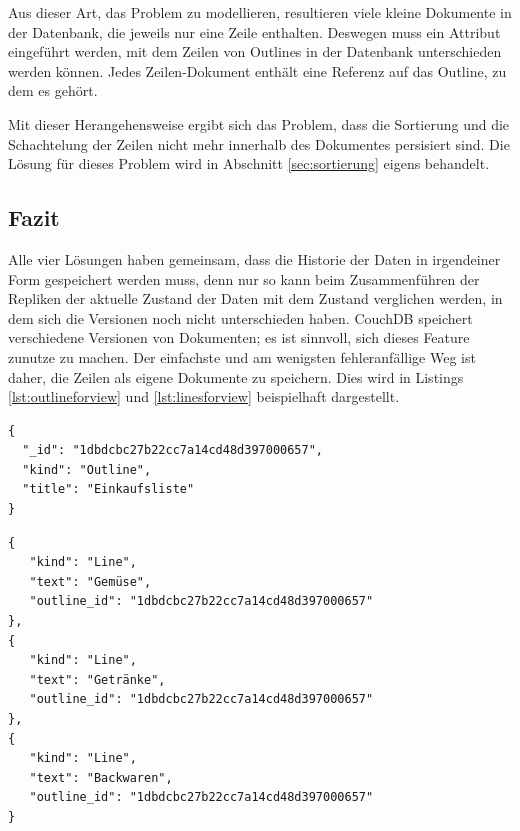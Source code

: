 Aus dieser Art, das Problem zu modellieren, resultieren viele kleine Dokumente in der Datenbank, die jeweils nur eine Zeile enthalten. Deswegen muss ein Attribut eingeführt werden, mit dem Zeilen von Outlines in der Datenbank unterschieden werden können. Jedes Zeilen-Dokument enthält eine Referenz auf das Outline, zu dem es gehört. 

Mit dieser Herangehensweise ergibt sich das Problem, dass die Sortierung und die Schachtelung der Zeilen nicht mehr innerhalb des Dokumentes persisiert sind. Die Lösung für dieses Problem wird in Abschnitt \ref{sec:sortierung} eigens behandelt. 

\subsection{Fazit}
\label{subsec:viewabfrage}

Alle vier Lösungen haben gemeinsam, dass die Historie der Daten in irgendeiner Form gespeichert werden muss, denn nur so kann beim Zusammenführen der Repliken der aktuelle Zustand der Daten mit dem Zustand verglichen werden, in dem sich die Versionen noch nicht unterschieden haben. CouchDB speichert verschiedene Versionen von Dokumenten; es ist sinnvoll, sich dieses Feature zunutze zu machen. Der einfachste und am wenigsten fehleranfällige Weg ist daher, die Zeilen als eigene Dokumente zu speichern. Dies wird in Listings \ref{lst:outlineforview} und \ref{lst:linesforview} beispielhaft dargestellt.


\medskip
\begin{lstlisting}[caption=Outline mit ID und Typ, label={lst:outlineforview}]
{
  "_id": "1dbdcbc27b22cc7a14cd48d397000657",
  "kind": "Outline",
  "title": "Einkaufsliste"
}
\end{lstlisting}

\medskip
\begin{lstlisting}[caption=Drei Zeilen mit ID und Typ, label={lst:linesforview}]
{
   "kind": "Line",
   "text": "Gemüse",
   "outline_id": "1dbdcbc27b22cc7a14cd48d397000657"
},
{
   "kind": "Line",
   "text": "Getränke",
   "outline_id": "1dbdcbc27b22cc7a14cd48d397000657"
},
{
   "kind": "Line",
   "text": "Backwaren",
   "outline_id": "1dbdcbc27b22cc7a14cd48d397000657"
}
\end{lstlisting}

